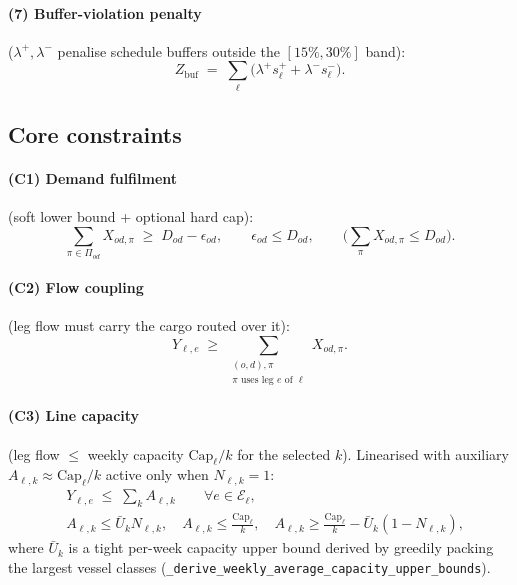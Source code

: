 \documentclass[11pt]{article}
\newcommand{\Cap}{\mathrm{Cap}}
\begin{document}
\paragraph{(7) Buffer-violation penalty} ($\lambda^{+},\lambda^{-}$ penalise schedule
buffers outside the $[15\%,30\%]$ band):
\begin{equation}
  Z_{\text{buf}} \;=\; \sum_{\ell}\big(\lambda^{+} s^{+}_\ell + \lambda^{-} s^{-}_\ell\big).
\end{equation}

\subsection{Core constraints}
\label{sec:constraints}

\paragraph{(C1) Demand fulfilment} (soft lower bound + optional hard cap):
\begin{equation}
  \sum_{\pi\in\Pi_{od}} X_{od,\pi} \;\ge\; D_{od} - \epsilon_{od},
  \qquad \epsilon_{od}\le D_{od},
  \qquad \Big(\sum_{\pi} X_{od,\pi} \le D_{od}\Big).
\end{equation}

\paragraph{(C2) Flow coupling} (leg flow must carry the cargo routed over it):
\begin{equation}
  Y_{\ell,e} \;\ge\; \sum_{\substack{(o,d),\pi \\ \pi \text{ uses leg } e \text{ of } \ell}} X_{od,\pi}.
\end{equation}

\paragraph{(C3) Line capacity} (leg flow $\le$ weekly capacity $\Cap_\ell/k$ for the
selected $k$). Linearised with auxiliary $A_{\ell,k}\approx \Cap_\ell/k$ active only
when $N_{\ell,k}=1$:
\begin{align}
  & Y_{\ell,e} \;\le\; \sum_k A_{\ell,k}\qquad\forall e\in\mathcal{E}_\ell, \\
  & A_{\ell,k}\le \bar U_k N_{\ell,k},\quad
    A_{\ell,k}\le \tfrac{\Cap_\ell}{k},\quad
    A_{\ell,k}\ge \tfrac{\Cap_\ell}{k} - \bar U_k(1-N_{\ell,k}),
\end{align}
where $\bar U_k$ is a tight per-week capacity upper bound derived by greedily packing
the largest vessel classes (\texttt{\_derive\_weekly\_average\_capacity\_upper\_bounds}).
\end{document}
